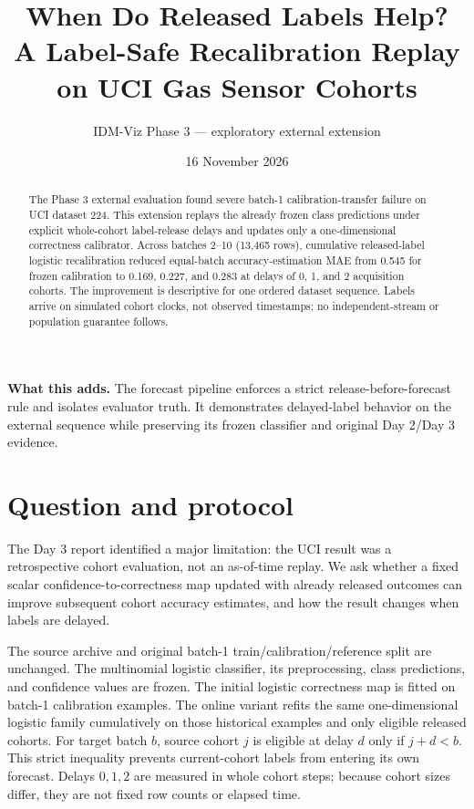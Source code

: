 \documentclass[10pt,a4paper]{article}
\title{\vspace{-1.4cm}\color{DeepTeal}\bfseries When Do Released Labels Help?\\[3pt]
\large A Label-Safe Recalibration Replay on UCI Gas Sensor Cohorts}
\author{IDM-Viz Phase 3 --- exploratory external extension}
\date{16 November 2026}
\begin{document}
\maketitle\vspace{-0.5cm}
\begin{abstract}\small
The Phase 3 external evaluation found severe batch-1 calibration-transfer failure on UCI dataset 224. This extension replays the already frozen class predictions under explicit whole-cohort label-release delays and updates only a one-dimensional correctness calibrator. Across batches 2--10 (13,465 rows), cumulative released-label logistic recalibration reduced equal-batch accuracy-estimation MAE from 0.545 for frozen calibration to 0.169, 0.227, and 0.283 at delays of 0, 1, and 2 acquisition cohorts. The improvement is descriptive for one ordered dataset sequence. Labels arrive on simulated cohort clocks, not observed timestamps; no independent-stream or population guarantee follows.
\end{abstract}
\vspace{-2mm}\noindent\colorbox{SoftTeal}{\parbox{0.97\linewidth}{\textbf{What this adds.} The forecast pipeline enforces a strict release-before-forecast rule and isolates evaluator truth. It demonstrates delayed-label behavior on the external sequence while preserving its frozen classifier and original Day 2/Day 3 evidence.}}
\section{Question and protocol}
The Day 3 report identified a major limitation: the UCI result was a retrospective cohort evaluation, not an as-of-time replay. We ask whether a fixed scalar confidence-to-correctness map updated with already released outcomes can improve subsequent cohort accuracy estimates, and how the result changes when labels are delayed.

The source archive and original batch-1 train/calibration/reference split are unchanged. The multinomial logistic classifier, its preprocessing, class predictions, and confidence values are frozen. The initial logistic correctness map is fitted on batch-1 calibration examples. The online variant refits the same one-dimensional logistic family cumulatively on those historical examples and only eligible released cohorts. For target batch $b$, source cohort $j$ is eligible at delay $d$ only if $j+d<b$. This strict inequality prevents current-cohort labels from entering its own forecast. Delays $0,1,2$ are measured in whole cohort steps; because cohort sizes differ, they are not fixed row counts or elapsed time.
\end{document}
